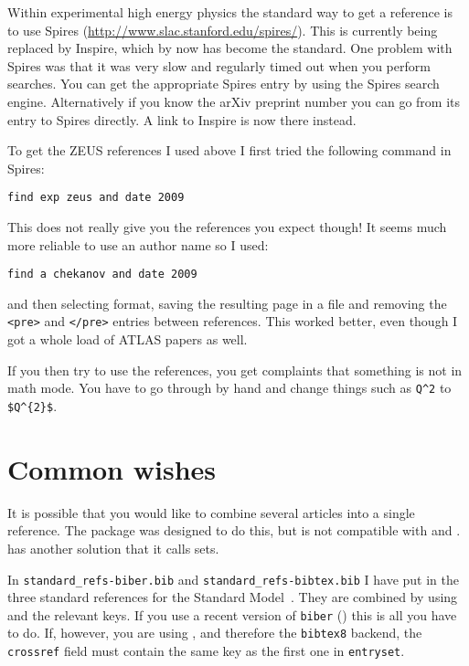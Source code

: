 Within experimental high energy physics the standard way to get a
reference is to use Spires
(\url{http://www.slac.stanford.edu/spires/}). This is currently being
replaced by Inspire, which by now has become the standard.
One problem with Spires was that it was very slow and regularly
timed out when you perform searches. You can get the appropriate
Spires entry by using the Spires search engine. Alternatively if you
know the arXiv preprint number you can go from its entry to Spires
directly. A link to Inspire is now there instead.

To get the ZEUS references I used above I first tried the following
command in Spires:
\begin{verbatim}
find exp zeus and date 2009
\end{verbatim}
This does not really give you the references you expect though! It
seems much more reliable to use an author name so I used:
\begin{verbatim}
find a chekanov and date 2009
\end{verbatim}
and then selecting \BibTeX{} format, saving the resulting page in a file
and removing the \texttt{<pre>} and \texttt{</pre>} entries between
references. This worked better, even though I got a whole load of
ATLAS papers as well.

If you then try to use the references, you get complaints that
something is not in math mode. You have to go through by hand and
change things such as \verb+Q^2+ to \verb+$Q^{2}$+.


\section{Common wishes}
\label{sec:ref:tips}

It is possible that you would like to combine several articles into a
single reference. The  package was designed to do this,
but is not compatible with  and
.  has another solution that it
calls sets.

In \texttt{standard\_refs-biber.bib} and
\texttt{standard\_refs-bibtex.bib} I have put in the three standard
references for the Standard Model~\cite{gsw}. They are combined by
using  and the relevant
keys. If you use a recent version of \texttt{biber} ()
this is all you have to do.  If, however, you are using , and therefore the \texttt{bibtex8} backend, the
\texttt{crossref} field must contain the same key as the first one in
\texttt{entryset}.

